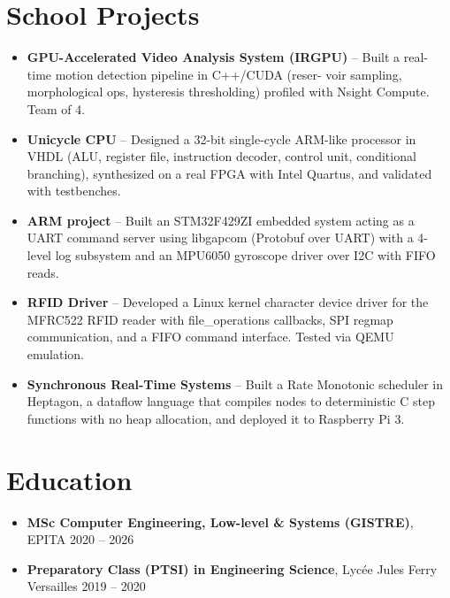 \documentclass[9pt,a4paper]{article}
\begin{document}
\section*{School Projects}
\begin{tcolorbox}[mybox]
\begin{itemize}
\item \textbf{GPU-Accelerated Video Analysis System (IRGPU)} -- Built a real-time motion detection pipeline in C++/CUDA (reser-
voir sampling, morphological ops, hysteresis thresholding) profiled with Nsight Compute. Team of 4.

\item \textbf{Unicycle CPU} -- Designed a 32-bit single-cycle ARM-like processor in VHDL (ALU, register file, instruction decoder, control unit, conditional branching), synthesized on a real FPGA with Intel Quartus, and validated with testbenches.

\item \textbf{ARM project} -- Built an STM32F429ZI embedded system acting as a UART command server using libgapcom (Protobuf over UART) with a 4-level log subsystem and an MPU6050 gyroscope driver over I2C with FIFO reads.

\item \textbf{RFID Driver} -- Developed a Linux kernel character device driver for the MFRC522 RFID reader with file\_operations callbacks, SPI regmap communication, and a FIFO command interface. Tested via QEMU emulation.

\item \textbf{Synchronous Real-Time Systems} -- Built a Rate Monotonic scheduler in Heptagon, a dataflow language that compiles nodes to deterministic C step functions with no heap allocation, and deployed it to Raspberry Pi 3.
\end{itemize}
\end{tcolorbox}


\section*{Education}
\begin{tcolorbox}[mybox]
\begin{itemize}
\item \textbf{MSc Computer Engineering, Low-level \& Systems (GISTRE)}, EPITA {\small{\hfill 2020 – 2026}}

\item \textbf{Preparatory Class (PTSI) in Engineering Science}, Lycée Jules Ferry Versailles {\small{\hfill 2019 – 2020}}
\end{itemize}
\end{tcolorbox}
\end{document}
